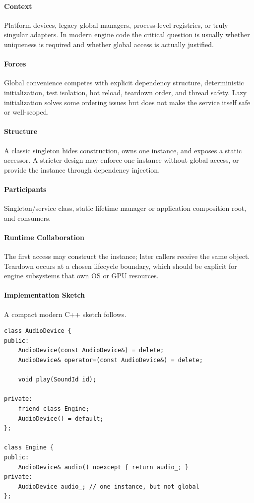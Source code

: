 \documentclass[11pt]{article}
\begin{document}
\paragraph{Context} Platform devices, legacy global managers, process-level registries, or truly singular adapters. In modern engine code the critical question is usually whether uniqueness is required and whether global access is actually justified.
\paragraph{Forces} Global convenience competes with explicit dependency structure, deterministic initialization, test isolation, hot reload, teardown order, and thread safety. Lazy initialization solves some ordering issues but does not make the service itself safe or well-scoped.
\paragraph{Structure} A classic singleton hides construction, owns one instance, and exposes a static accessor. A stricter design may enforce one instance without global access, or provide the instance through dependency injection.
\paragraph{Participants} Singleton/service class, static lifetime manager or application composition root, and consumers.
\paragraph{Runtime Collaboration} The first access may construct the instance; later callers receive the same object. Teardown occurs at a chosen lifecycle boundary, which should be explicit for engine subsystems that own OS or GPU resources.
\paragraph{Implementation Sketch} A compact modern C++ sketch follows.
\begin{lstlisting}
class AudioDevice {
public:
    AudioDevice(const AudioDevice&) = delete;
    AudioDevice& operator=(const AudioDevice&) = delete;

    void play(SoundId id);

private:
    friend class Engine;
    AudioDevice() = default;
};

class Engine {
public:
    AudioDevice& audio() noexcept { return audio_; }
private:
    AudioDevice audio_; // one instance, but not global
};
\end{lstlisting}
\end{document}

